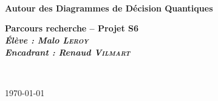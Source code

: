 \begin{center}

~\\[1cm]


\textsc{\Large }\\[0.5cm]

\HRule \\[0.4cm]

{\huge \bfseries Autour des Diagrammes de Décision Quantiques\\
[0.4cm] }

{\large \bfseries Parcours recherche -- Projet S6\\[0.4cm] }
{\large \bfseries \textsl{Élève : Malo \textsc{Leroy}}\\ }
{\large \bfseries \textsl{Encadrant : Renaud \textsc{Vilmart}}\\[0.4cm] }


\HRule \\[1.5cm]

\begingroup
\let\clearpage\relax
\tableofcontents
\endgroup

\vfill

{\large \today}

\end{center}